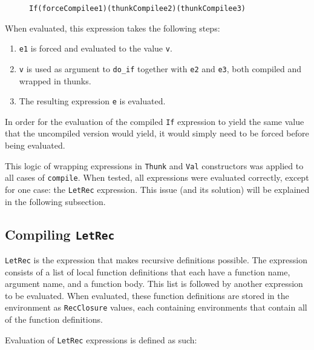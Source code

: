 \begin{figure}[H]
\begin{alltt}
  If (forceCompile e1) (thunkCompile e2) (thunkCompile e3)
\end{alltt}
\end{figure}

\noindent When evaluated, this expression takes the following steps:

\begin{enumerate}
\item \texttt{e1} is forced and evaluated to the value \texttt{v}.
\item \texttt{v} is used as argument to \texttt{do\_if} together with \texttt{e2} and \texttt{e3}, both compiled and wrapped in thunks.
\item The resulting expression \texttt{e} is evaluated.
\end{enumerate}

\noindent In order for the evaluation of the compiled \texttt{If} expression to
yield the same value that the uncompiled version would yield, it would simply
need to be forced before being evaluated.

This logic of wrapping expressions in \texttt{Thunk} and \texttt{Val}
constructors was applied to all cases of \texttt{compile}. When tested, all
expressions were evaluated correctly, except for one case: the \texttt{LetRec}
expression. This issue (and its solution) will be explained in the following
subsection.

\subsection{Compiling \texttt{LetRec}}
\texttt{LetRec} is the expression that makes recursive definitions possible.
The expression consists of a list of local function definitions that each have a
function name, argument name, and a function body. This list is followed by
another expression to be evaluated. When evaluated, these function definitions
are stored in the environment as \texttt{RecClosure} values, each containing
environments that contain all of the function definitions.

Evaluation of \texttt{LetRec} expressions is defined as such:

